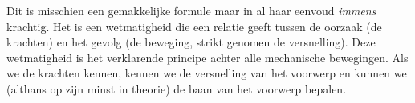 \documentclass{ximera}
\begin{document}
	Dit is misschien een gemakkelijke formule maar in al haar eenvoud \emph{immens} krachtig. Het is een wetmatigheid die een relatie geeft tussen de oorzaak (de krachten) en het gevolg (de beweging, strikt genomen de versnelling). Deze wetmatigheid is het verklarende principe achter alle mechanische bewegingen. Als we de krachten kennen, kennen we de versnelling van het voorwerp en kunnen we (althans op zijn minst in theorie) de baan van het voorwerp bepalen.
	
\end{document}
